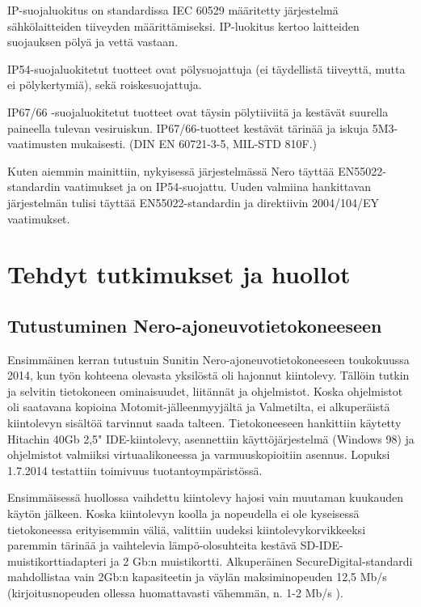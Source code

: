 \documentclass[11pt,a4paper,oneside,article]{memoir}
\begin{document}
IP-suojaluokitus on standardissa IEC 60529 määritetty järjestelmä sähkölaitteiden tiiveyden määrittämiseksi. IP-luokitus kertoo laitteiden suojauksen pölyä ja vettä vastaan. \cite{IEC60529}

IP54-suojaluokitetut tuotteet ovat pölysuojattuja (ei täydellistä tiiveyttä, mutta ei pölykertymiä), sekä roiskesuojattuja.

IP67/66 -suojaluokitetut tuotteet ovat täysin pölytiiviitä ja kestävät suurella paineella tulevan vesiruiskun. IP67/66-tuotteet kestävät tärinää ja iskuja 5M3-vaatimusten mukaisesti. (DIN EN 60721-3-5, MIL-STD 810F.)

Kuten aiemmin mainittiin, nykyisessä järjestelmässä Nero täyttää EN55022-standardin vaatimukset ja on IP54-suojattu. Uuden valmiina hankittavan järjestelmän tulisi täyttää EN55022-standardin ja direktiivin  2004/104/EY vaatimukset.

\newpage
\chapter{Tehdyt tutkimukset ja huollot}

\section{Tutustuminen Nero-ajoneuvotietokoneeseen}

Ensimmäinen kerran tutustuin Sunitin Nero-ajoneuvotietokoneeseen toukokuussa 2014, kun työn kohteena olevasta yksilöstä oli hajonnut kiintolevy. Tällöin tutkin ja selvitin tietokoneen ominaisuudet, liitännät ja ohjelmistot. Koska ohjelmistot oli saatavana kopioina Motomit-jälleenmyyjältä ja Valmetilta, ei alkuperäistä kiintolevyn sisältöä tarvinnut saada talteen. Tietokoneeseen hankittiin käytetty Hitachin 40Gb 2,5" IDE-kiintolevy, asennettiin käyttöjärjestelmä (Windows 98) ja ohjelmistot valmiiksi virtuaalikoneessa ja varmuuskopioitiin asennus. Lopuksi 1.7.2014 testattiin toimivuus tuotantoympäristössä.

Ensimmäisessä huollossa vaihdettu kiintolevy hajosi vain muutaman kuukauden käytön jälkeen. Koska kiintolevyn koolla ja nopeudella ei ole kyseisessä tietokoneessa erityisemmin väliä, valittiin uudeksi kiintolevykorvikkeeksi paremmin tärinää ja vaihtelevia lämpö-olosuhteita kestävä SD-IDE-muistikorttiadapteri ja 2 Gb:n muistikortti. Alkuperäinen SecureDigital-standardi mahdollistaa vain 2Gb:n kapasiteetin ja väylän maksiminopeuden 12,5 Mb/s (kirjoitusnopeuden ollessa huomattavasti vähemmän, n. 1-2 Mb/s )\cite{sd:2gb}.
\end{document}
